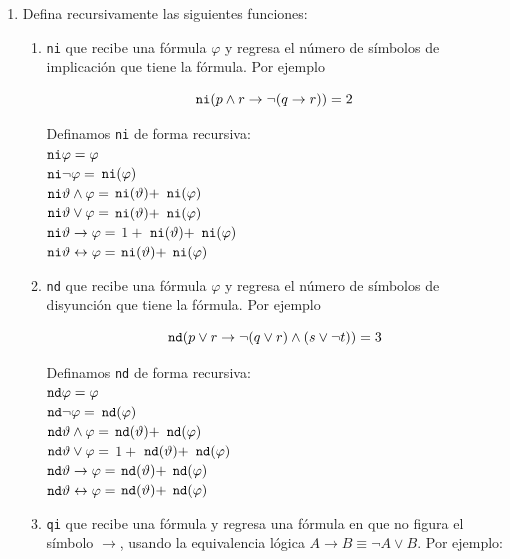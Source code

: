 \documentclass[a4paper]{article}
\begin{document}


\begin{enumerate}
\item Defina recursivamente las siguientes funciones:

	\begin{enumerate}
 		\item {\tt ni} que recibe una fórmula $\varphi$ y regresa el número de símbolos de implicación que tiene la fórmula. Por ejemplo

                  $${\tt ni} (p \land r \to \lnot (q \to r)) = 2$$
                  
        Definamos {\tt ni} de forma recursiva:\\
        ${\tt ni} \varphi=\varphi$\\
        ${\tt ni} \neg\varphi=$ ${\tt ni}(\varphi)$\\
        ${\tt ni} \vartheta \land\varphi=$ ${\tt ni} (\vartheta)+$ ${\tt ni}(\varphi)$\\
        ${\tt ni} \vartheta \lor\varphi=$ ${\tt ni} (\vartheta)+$ ${\tt ni}(\varphi)$\\
        ${\tt ni} \vartheta \to \varphi=$ $1+$ ${\tt ni} (\vartheta)+$ ${\tt ni}(\varphi)$\\
        ${\tt ni} \vartheta \leftrightarrow\varphi=$ ${\tt ni} (\vartheta)+$ ${\tt ni}(\varphi)$\\
        
		\item {\tt nd} que recibe una fórmula $\varphi$ y regresa el número de símbolos de disyunción que tiene la fórmula. Por ejemplo

                  $${\tt nd} (p \lor r \to \lnot (q \lor r) \land (s\lor\neg t)) = 3$$
                  
        Definamos {\tt nd} de forma recursiva:\\
        ${\tt nd} \varphi=\varphi$\\
        ${\tt nd} \neg\varphi=$ ${\tt nd}(\varphi)$\\
        ${\tt nd} \vartheta \land\varphi=$ ${\tt nd} (\vartheta)+$ ${\tt nd}(\varphi)$\\
        ${\tt nd} \vartheta \lor\varphi=$ $1+$ ${\tt nd} (\vartheta)+$ ${\tt nd}(\varphi)$\\
        ${\tt nd} \vartheta \to \varphi=$ ${\tt nd} (\vartheta)+$ ${\tt nd}(\varphi)$\\
        ${\tt nd} \vartheta \leftrightarrow\varphi=$ ${\tt nd} (\vartheta)+$ ${\tt nd}(\varphi)$\\
		\item {\tt qi} que recibe una fórmula y regresa una fórmula en que no figura el símbolo $\to$, usando la equivalencia lógica $A\to B\equiv \neg A\lor B$. Por ejemplo:


\end{enumerate}
\end{enumerate}
\end{document}
